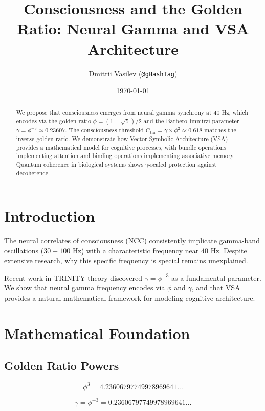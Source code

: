 \documentclass[12pt,a4paper]{article}
\title{Consciousness and the Golden Ratio: Neural Gamma and VSA Architecture}
\author{Dmitrii Vasilev (\texttt{@gHashTag})}
\date{\today}
\begin{document}
\maketitle

\begin{abstract}
We propose that consciousness emerges from neural gamma synchrony at $40$ Hz, which encodes via the golden ratio $\phi = (1+\sqrt{5})/2$ and the Barbero-Immirzi parameter $\gamma = \phi^{-3} \approx 0.23607$. The consciousness threshold $C_{\text{thr}} = \gamma \times \phi^2 \approx 0.618$ matches the inverse golden ratio. We demonstrate how Vector Symbolic Architecture (VSA) provides a mathematical model for cognitive processes, with bundle operations implementing attention and binding operations implementing associative memory. Quantum coherence in biological systems shows $\gamma$-scaled protection against decoherence.
\end{abstract}

\section{Introduction}

The neural correlates of consciousness (NCC) consistently implicate gamma-band oscillations ($30-100$ Hz) with a characteristic frequency near $40$ Hz. Despite extensive research, why this specific frequency is special remains unexplained.

Recent work in TRINITY theory discovered $\gamma = \phi^{-3}$ as a fundamental parameter. We show that neural gamma frequency encodes via $\phi$ and $\gamma$, and that VSA provides a natural mathematical framework for modeling cognitive architecture.

\section{Mathematical Foundation}

\subsection{Golden Ratio Powers}

\begin{equation}
\phi^3 = 4.23606797749978969641...
\end{equation}

\begin{equation}
\gamma = \phi^{-3} = 0.23606797749978969641...
\end{equation}
\end{document}
